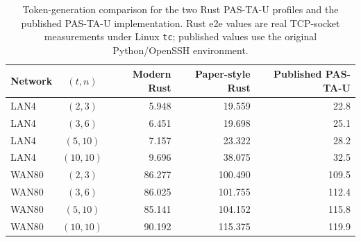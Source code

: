 \begin{table}[t]
\centering
\caption{Token-generation comparison for the two Rust PAS-TA-U profiles and the published PAS-TA-U implementation. Rust e2e values are real TCP-socket measurements under Linux \texttt{tc}; published values use the original Python/OpenSSH environment.}
\label{tab:pastau-token-generation-all-three}
\begin{tabular}{l c r r r}
\toprule
Network & $(t,n)$ & Modern Rust & Paper-style Rust & Published PAS-TA-U \\
\midrule
LAN4 & $(2,3)$ & 5.948 & 19.559 & 22.8 \\
LAN4 & $(3,6)$ & 6.451 & 19.698 & 25.1 \\
LAN4 & $(5,10)$ & 7.157 & 23.322 & 28.2 \\
LAN4 & $(10,10)$ & 9.696 & 38.075 & 32.5 \\
\midrule
WAN80 & $(2,3)$ & 86.277 & 100.490 & 109.5 \\
WAN80 & $(3,6)$ & 86.025 & 101.755 & 112.4 \\
WAN80 & $(5,10)$ & 85.141 & 104.152 & 115.8 \\
WAN80 & $(10,10)$ & 90.192 & 115.375 & 119.9 \\
\bottomrule
\end{tabular}
\end{table}
